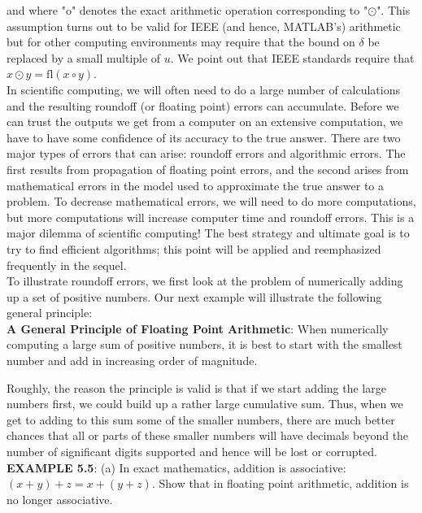 \documentclass[../main.tex]{subfiles}
\begin{document}
and where "o" denotes the exact arithmetic operation corresponding to "$\odot$". This assumption turns out to be valid for IEEE (and hence, MATLAB's) arithmetic but for other computing environments may require that the bound on $\delta$ be replaced by a small multiple of $u$. We point out that IEEE standards require that $x \odot y=\mathrm{fl}(x \circ y)$.\\

In scientific computing, we will often need to do a large number of calculations and the resulting roundoff (or floating point) errors can accumulate. Before we can trust the outputs we get from a computer on an extensive computation, we have to have some confidence of its accuracy to the true answer. There are two major types of errors that can arise: roundoff errors and algorithmic errors. The first results from propagation of floating point errors, and the second arises from mathematical errors in the model used to approximate the true answer to a problem. To decrease mathematical errors, we will need to do more computations, but more computations will increase computer time and roundoff errors. This is a major dilemma of scientific computing! The best strategy and ultimate goal is to try to find efficient algorithms; this point will be applied and reemphasized frequently in the sequel.\\

To illustrate roundoff errors, we first look at the problem of numerically adding up a set of positive numbers. Our next example will illustrate the following general principle:\\

\textbf{A General Principle of Floating Point Arithmetic}: When numerically computing a large sum of positive numbers, it is best to start with the smallest number and add in increasing order of magnitude.

Roughly, the reason the principle is valid is that if we start adding the large numbers first, we could build up a rather large cumulative sum. Thus, when we get to adding to this sum some of the smaller numbers, there are much better chances that all or parts of these smaller numbers will have decimals beyond the number of significant digits supported and hence will be lost or corrupted.\\

\textbf{EXAMPLE 5.5}: (a) In exact mathematics, addition is associative: $(x+y)+z=x+(y+z)$. Show that in floating point arithmetic, addition is no longer associative.
\end{document}
